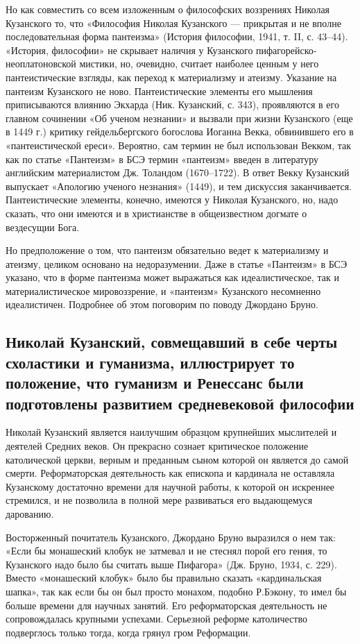 Но как совместить со всем  изложенным о философских воззрениях Николая
Кузанского то,  что «Философия Николая  Кузанского --- прикрытая  и не
вполне последовательная форма пантеизма»  (История философии, 1941, т.
II, с. 43--44). «История, философии»  не скрывает наличия у Кузанского
пифагорейско-неоплатоновской мистики,  но, очевидно,  считает наиболее
ценным у  него пантеистические взгляды,  как переход к  материализму и
атеизму.  Указание на  пантеизм  Кузанского  не ново.  Пантеистические
элементы его  мышления приписываются влиянию Экхарда  (Ник. Кузанский,
с. 343),  проявляются в его  главном сочинении «Об ученом  незнании» и
вызвали при жизни Кузанского (еще  в 1449 г.) критику гейдельбергского
богослова Иоганна  Векка, обвинившего  его в  «пантеистической ереси».
Вероятно,  сам термин  не был  использован Векком,  так как  по статье
«Пантеизм»  в БСЭ  термин  «пантеизм» введен  в литературу  английским
материалистом  Дж.  Толандом  (1670--1722). В  ответ  Векку  Кузанский
выпускает  «Апологию   ученого  незнания»  (1449),  и   тем  дискуссия
заканчивается.  Пантеистические элементы,  конечно, имеются  у Николая
Кузанского,  но, надо  сказать, что  они  имеются и  в христианстве  в
общеизвестном догмате о вездесущии Бога.

Но предположение о том, что  пантеизм обязательно ведет к материализму
и  атеизму,   целиком  основано   на  недоразумении.  Даже   в  статье
«Пантеизм» в БСЭ  указано, что в форме пантеизма  может выражаться как
идеалистическое, так и  материалистическое мировоззрение, и «пантеизм»
Кузанского  несомненно идеалистичен.  Подробнее об  этом поговорим  по
поводу Джордано Бруно.

\subsection{Николай Кузанский,  совмещавший в себе черты  схоластики и
гуманизма, иллюстрирует  то положение,  что гуманизм и  Ренессанс были
подготовлены развитием средневековой философии}

Николай Кузанский является наилучшим  образцом крупнейших мыслителей и
деятелей  Средних веков.  Он прекрасно  сознает критическое  положение
католической церкви, верным  и преданным сыном которой  он является до
самой смерти. Реформаторская деятельность  как епископа и кардинала не
оставляла Кузанскому достаточно времени  для научной работы, к которой
он искреннее стремился,  и не позволила в полной  мере развиваться его
выдающемуся дарованию.

Восторженный  почитатель Кузанского,  Джордано Бруно  выразился о  нем
так: «Если  бы монашеский клобук  не затмевал  и не стеснял  порой его
гения, то Кузанского  надо было бы считать выше  Пифагора» (Дж. Бруно,
1934, с.  229). Вместо «монашеский  клобук» было бы  правильно сказать
«кардинальская  шапка»,  так  как  если  бы  он  был  просто  монахом,
подобно  Р.Бэкону, то  имел  бы больше  времени  для научных  занятий.
Его реформаторская  деятельность не сопровождалась  крупными успехами.
Серьезной реформе католичество подверглось  только тогда, когда грянул
гром Реформации.

